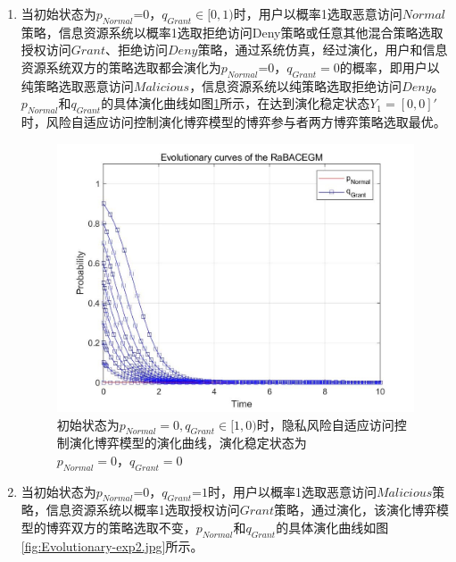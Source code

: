\begin{enumerate}
 	\item 当初始状态为${{p}_{Normal}}\text{=0}$，${{q}_{Grant}}\in [0,1)$时，用户以概率1选取恶意访问$Normal$策略，信息资源系统以概率1选取拒绝访问Deny策略或任意其他混合策略选取授权访问$Grant$、拒绝访问$Deny$策略，通过系统仿真，经过演化，用户和信息资源系统双方的策略选取都会演化为${{p}_{Normal}}\text{=0}$，${{q}_{Grant}}=0$的概率，即用户以纯策略选取恶意访问$Malicious$，信息资源系统以纯策略选取拒绝访问$Deny$。${{p}_{Normal}}$和${{q}_{Grant}}$的具体演化曲线如图\ref{fig:Evolutionary-exp1}所示，在达到演化稳定状态${{Y}_{1}}=[0,0]'$时，风险自适应访问控制演化博弈模型的博弈参与者两方博弈策略选取最优。
 	
 	 \begin{figure}[htbp]
 		\centering
 		\includegraphics[width=0.8\linewidth]{./figures/Evolutionary-exp1.jpg}
 		\centering
 		\caption{初始状态为$p_{Normal}=0,q_{Grant}∈[1,0)$时，隐私风险自适应访问控制演化博弈模型的演化曲线，演化稳定状态为$p_{Normal}=0，q_{Grant}=0$}\label{fig:Evolutionary-exp1}
 	\end{figure}
 
 	\item 当初始状态为${{p}_{Normal}}\text{=0}$，${{q}_{Grant}}\text{=}1$时，用户以概率1选取恶意访问$Malicious$策略，信息资源系统以概率1选取授权访问$Grant$策略，通过演化，该演化博弈模型的博弈双方的策略选取不变，${{p}_{Normal}}$和${{q}_{Grant}}$的具体演化曲线如图\ref{fig:Evolutionary-exp2.jpg}所示。
 	

\end{enumerate}
